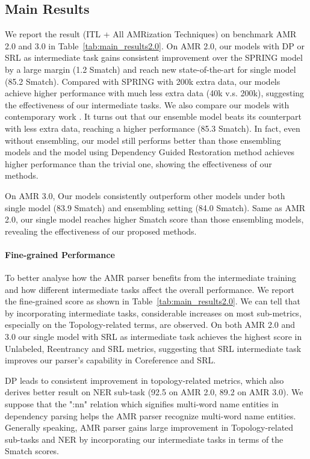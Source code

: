 \documentclass[11pt]{article}
\begin{document}
 

\subsection{Main Results} 
We report the result (ITL + All AMRization Techniques) on benchmark AMR 2.0 and 3.0 in Table~\ref{tab:main_results2.0}. On AMR 2.0, our models with DP or SRL as intermediate task gains consistent improvement over the SPRING model by a large margin (1.2 Smatch) and reach new state-of-the-art for single model (85.2 Smatch). Compared with SPRING with 200k extra data, our models achieve higher performance with much less extra data (40k v.s. 200k), suggesting the effectiveness of our intermediate tasks. We also compare our models with contemporary work \citep{lam2021ensembling,saft}. It turns out that our ensemble model beats its counterpart with less extra data, reaching a higher performance (85.3 Smatch). In fact, even without ensembling, our model still performs better than those ensembling models and the model using Dependency Guided Restoration method achieves higher performance than the trivial one, showing the effectiveness of our methods.

On AMR 3.0, Our models consistently outperform other models under both single model (83.9 Smatch) and ensembling setting (84.0 Smatch). Same as AMR 2.0, our single model reaches higher Smatch score than those ensembling models, revealing the effectiveness of our proposed methods. 

\paragraph{Fine-grained Performance} To better analyse how the AMR parser benefits from the intermediate training and how different intermediate tasks affect the overall performance. We report the fine-grained score as shown in Table~\ref{tab:main_results2.0}. We can tell that by incorporating intermediate tasks, considerable increases on most sub-metrics, especially on the Topology-related terms, are observed. On both AMR 2.0 and 3.0 our single model with SRL as intermediate task achieves the highest score in Unlabeled, Reentrancy and SRL metrics, suggesting that SRL intermediate task improves our parser's capability in Coreference and SRL. 

DP leads to consistent improvement in topology-related metrics, which also derives better result on NER sub-task (92.5 on AMR 2.0, 89.2 on AMR 3.0). We suppose that the ":nn" relation which signifies multi-word name entities in dependency parsing helps the AMR parser recognize multi-word name entities.
Generally speaking, AMR parser gains large improvement in Topology-related sub-tasks and NER by incorporating our intermediate tasks in terms of the Smatch scores.
\end{document}
